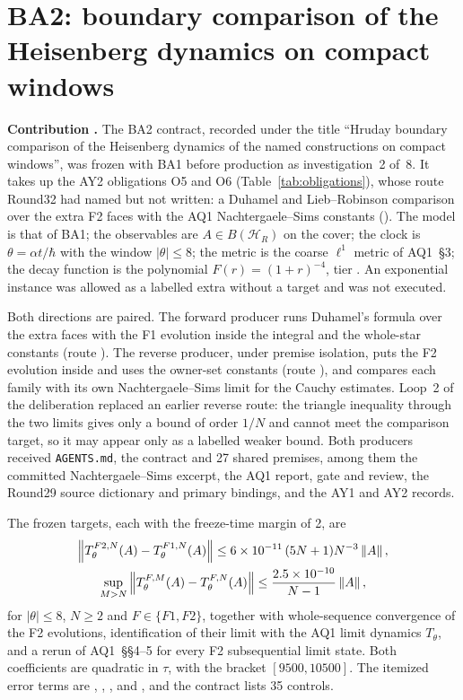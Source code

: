\section{BA2: boundary comparison of the Heisenberg dynamics on compact windows}
\label{sec:ba2}

\textbf{Contribution .} The BA2 contract, recorded under
the title ``Hruday boundary comparison of the Heisenberg dynamics of the
named constructions on compact windows'', was frozen with BA1 before
production as investigation~2 of~8. It takes up the AY2 obligations O5 and O6
(Table~\ref{tab:obligations}), whose route Round32 had named but not written:
a Duhamel and Lieb--Robinson comparison over the extra F2 faces with the AQ1
Nachtergaele--Sims constants
(). The model
is that of BA1; the observables are $A\in B(\mathcal H_R)$ on the cover; the
clock is $\theta=\alpha t/\hbar$ with the window $|\theta|\le8$; the metric is
the coarse $\ell^1$ metric of AQ1~\S3; the decay function is the polynomial
$F(r)=(1+r)^{-4}$, tier . An exponential
instance was allowed as a labelled extra without a target and was not
executed.

Both directions are paired. The forward producer runs Duhamel's formula over
the extra faces with the F1 evolution inside the integral and the whole-star
constants (route ). The reverse producer, under
premise isolation, puts the F2 evolution inside and uses the owner-set
constants (route ), and compares each family with its
own Nachtergaele--Sims limit for the Cauchy estimates. Loop~2 of the
deliberation replaced an earlier reverse route: the triangle inequality
through the two limits gives only a bound of order $1/N$ and cannot meet the
comparison target, so it may appear only as a labelled weaker bound. Both
producers received \texttt{AGENTS.md}, the contract and 27 shared premises,
among them the committed Nachtergaele--Sims excerpt, the AQ1 report, gate and
review, the Round29 source dictionary and primary bindings, and the AY1 and
AY2 records.

The frozen targets, each with the freeze-time margin of 2, are
\begin{equation}
 \begin{gathered}
 \left\lVert T^{F2,N}_\theta(A)-T^{F1,N}_\theta(A)\right\rVert\le6\times10^{-11}\,(5N+1)N^{-3}\left\lVert A\right\rVert,\\
 \sup_{M>N}\left\lVert T^{F,M}_\theta(A)-T^{F,N}_\theta(A)\right\rVert\le\frac{2.5\times10^{-10}}{N-1}\left\lVert A\right\rVert,
 \end{gathered}
 \label{eq:ba2-targets}
\end{equation}
for $|\theta|\le8$, $N\ge2$ and $F\in\{F1,F2\}$, together with whole-sequence
convergence of the F2 evolutions, identification of their limit with the AQ1
limit dynamics $T_\theta$, and a rerun of AQ1~\S\S4--5 for every F2
subsequential limit state. Both coefficients are quadratic in $\tau$, with
the bracket $[9500,10500]$. The itemized error terms are
, ,
,  and
, and the contract lists 35 controls.

